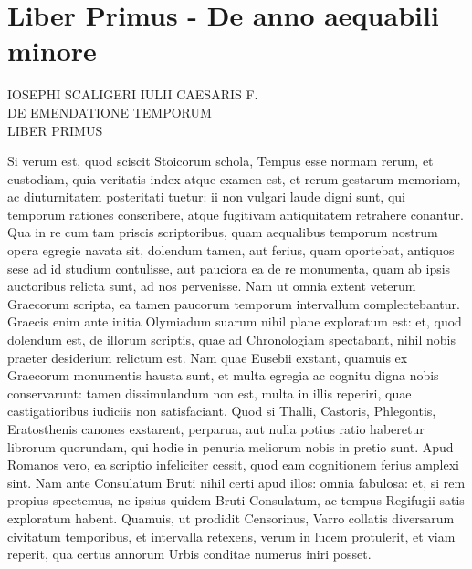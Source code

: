 

\chapter{Liber Primus - De anno aequabili minore}
\begin{center}
{\scshape
IOSEPHI SCALIGERI IULII CAESARIS F.\\
DE EMENDATIONE TEMPORUM\\
LIBER PRIMUS\\
}%
\end{center}
\normalsize

Si verum est, quod sciscit Stoicorum
schola, Tempus esse normam rerum, et
custodiam, quia veritatis index atque examen
est, et rerum gestarum memoriam, ac
diuturnitatem posteritati tuetur: ii non vulgari
laude digni sunt, qui temporum rationes
conscribere, atque fugitivam antiquitatem
retrahere conantur.
Qua in re cum
tam priscis scriptoribus, quam aequalibus
temporum nostrum opera egregie navata sit, dolendum tamen, aut
ferius, quam oportebat, antiquos sese ad id studium contulisse, aut pauciora
ea de re monumenta, quam ab ipsis auctoribus relicta sunt, ad
nos pervenisse.
Nam ut omnia extent veterum Graecorum scripta, ea
tamen paucorum temporum intervallum complectebantur.
Graecis
enim ante initia Olymiadum suarum nihil plane exploratum est: et,
quod dolendum est, de illorum scriptis, quae ad Chronologiam spectabant,
nihil nobis praeter desiderium relictum est.
Nam quae Eusebii exstant,
quamuis ex Graecorum monumentis hausta sunt, et multa egregia
ac cognitu digna nobis conservarunt: tamen dissimulandum non est,
multa in illis reperiri, quae castigatioribus iudiciis non satisfaciant.
Quod si Thalli, Castoris, Phlegontis,
 Eratosthenis canones exstarent,
perparua, aut nulla potius ratio haberetur librorum quorundam, qui
hodie in penuria meliorum nobis in pretio sunt.
Apud Romanos vero,
ea scriptio infeliciter cessit, quod eam cognitionem ferius amplexi sint.
Nam ante Consulatum Bruti nihil certi apud illos: omnia fabulosa: et,
si rem propius spectemus, ne ipsius quidem Bruti Consulatum, ac tempus
Regifugii satis exploratum habent.
Quamuis, ut prodidit Censorinus,
Varro collatis diversarum civitatum temporibus, et intervalla retexens,
verum in lucem protulerit, et viam reperit, qua certus
annorum Urbis conditae numerus iniri posset.

